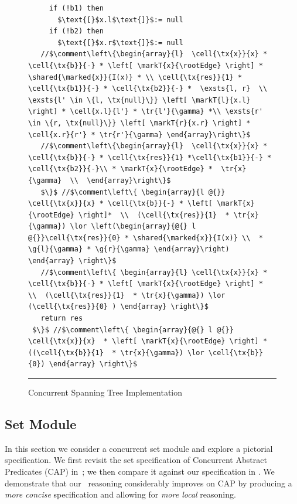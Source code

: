\begin{figure}
\begin{lstlisting}
     if (!b1) then 
       $\text{[}$x.l$\text{]}$:= null
     if (!b2) then 
       $\text{[}$x.r$\text{]}$:= null
   //$\comment\left\{\begin{array}{l}  \cell{\tx{x}}{x} * \cell{\tx{b}}{-} * \left[ \markT{x}{\rootEdge} \right] * \shared{\marked{x}}{I(x)} * \\ \cell{\tx{res}}{1} * \cell{\tx{b1}}{-} * \cell{\tx{b2}}{-} *  \exsts{l, r}  \\ \exsts{l' \in \{l, \tx{null}\}} \left[ \markT{l}{x.l} \right] * \cell{x.l}{l'} * \tr{l'}{\gamma} *\\ \exsts{r' \in \{r, \tx{null}\}} \left[ \markT{r}{x.r} \right] * \cell{x.r}{r'} * \tr{r'}{\gamma} \end{array}\right\}$  
   //$\comment\left\{\begin{array}{l}  \cell{\tx{x}}{x} * \cell{\tx{b}}{-} * \cell{\tx{res}}{1} *\cell{\tx{b1}}{-} * \cell{\tx{b2}}{-}\\ * \markT{x}{\rootEdge} *  \tr{x}{\gamma}  \\  \end{array}\right\}$         
   $\}$ //$\comment\left\{ \begin{array}{l @{}} \cell{\tx{x}}{x} * \cell{\tx{b}}{-} * \left[ \markT{x}{\rootEdge} \right]*  \\  (\cell{\tx{res}}{1}  * \tr{x}{\gamma}) \lor \left(\begin{array}{@{} l @{}}\cell{\tx{res}}{0} * \shared{\marked{x}}{I(x)} \\  * \g{l}{\gamma} * \g{r}{\gamma} \end{array}\right) \end{array} \right\}$ 
   //$\comment\left\{ \begin{array}{l} \cell{\tx{x}}{x} * \cell{\tx{b}}{-} * \left[ \markT{x}{\rootEdge} \right] *  \\  (\cell{\tx{res}}{1}  * \tr{x}{\gamma}) \lor (\cell{\tx{res}}{0} ) \end{array} \right\}$      
   return res
 $\}$ //$\comment\left\{ \begin{array}{@{} l @{}} \cell{\tx{x}}{x}  * \left[ \markT{x}{\rootEdge} \right] *  ((\cell{\tx{b}}{1}  * \tr{x}{\gamma}) \lor \cell{\tx{b}}{0}) \end{array} \right\}$         
\end{lstlisting}
\hrule\vspace*{-6pt}
\caption{Concurrent Spanning Tree Implementation}
\label{fig:conSpanningTree}
\end{figure}
%
%
\subsection{Set Module}
\label{sec:set}
In this section we consider a concurrent set module and explore a pictorial specification. We first revisit the set specification of Concurrent Abstract Predicates (CAP) in~\cite{cap-ecoop10}; we then compare it against our specification in \colosl. We demonstrate that our \colosl\ reasoning considerably improves on CAP by producing a \emph{more concise} specification and allowing for \emph{more local} reasoning. 

